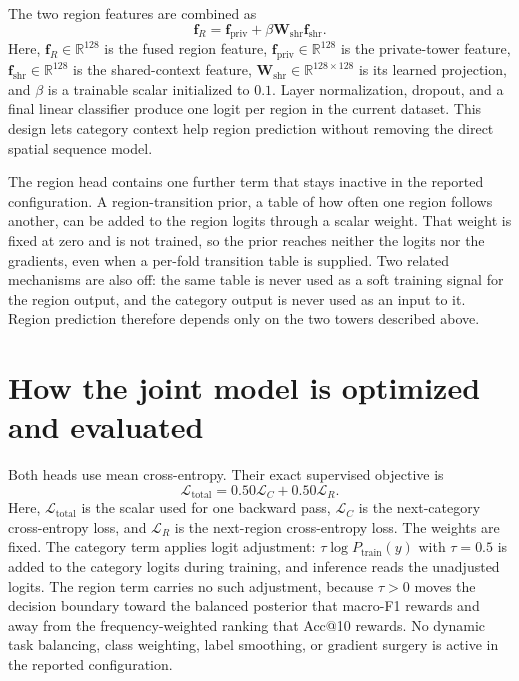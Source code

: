 The two region features are combined as
\begin{equation}
    \mathbf{f}_{R}
    =\mathbf{f}_{\mathrm{priv}}
    +\beta\mathbf{W}_{\mathrm{shr}}\mathbf{f}_{\mathrm{shr}}.
    \label{eq:apx-region-fusion}
\end{equation}
Here, $\mathbf{f}_{R}\in\mathbb{R}^{128}$ is the fused region feature,
$\mathbf{f}_{\mathrm{priv}}\in\mathbb{R}^{128}$ is the private-tower feature,
$\mathbf{f}_{\mathrm{shr}}\in\mathbb{R}^{128}$ is the shared-context feature,
$\mathbf{W}_{\mathrm{shr}}\in\mathbb{R}^{128\times128}$ is its learned projection,
and $\beta$ is a trainable scalar initialized to $0.1$. Layer normalization,
dropout, and a final linear classifier produce one logit per region in the current
dataset. This design lets category context help region prediction without removing
the direct spatial sequence model.

The region head contains one further term that stays inactive in the reported
configuration. A region-transition prior, a table of how often one region follows
another, can be added to the region logits through a scalar weight. That weight is
fixed at zero and is not trained, so the prior reaches neither the logits nor the
gradients, even when a per-fold transition table is supplied. Two related mechanisms
are also off: the same table is never used as a soft training signal for the region
output, and the category output is never used as an input to it. Region prediction
therefore depends only on the two towers described above.

\section{How the joint model is optimized and evaluated}
\label{sec:apx-joint-training}

Both heads use mean cross-entropy. Their exact supervised objective is
\begin{equation}
    \mathcal{L}_{\mathrm{total}}
    =0.50\mathcal{L}_{C}+0.50\mathcal{L}_{R}.
    \label{eq:apx-joint-loss}
\end{equation}
Here, $\mathcal{L}_{\mathrm{total}}$ is the scalar used for one backward pass,
$\mathcal{L}_{C}$ is the next-category cross-entropy loss, and
$\mathcal{L}_{R}$ is the next-region cross-entropy loss. The weights are fixed.
The category term applies logit adjustment: $\tau\log P_{\mathrm{train}}(y)$ with
$\tau=0.5$ is added to the category logits during training, and inference reads the
unadjusted logits. The region term carries no such adjustment, because $\tau>0$ moves the
decision boundary toward the balanced posterior that macro-F1 rewards and away from the
frequency-weighted ranking that Acc@10 rewards. No dynamic task balancing, class
weighting, label smoothing, or gradient surgery is active in the reported configuration.

